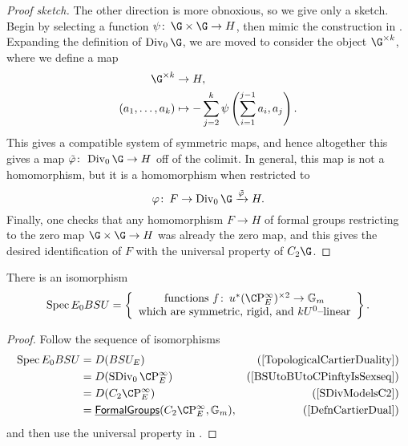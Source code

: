 \begin{proof}[Proof sketch]
The other direction is more obnoxious, so we give only a sketch.  Begin by selecting a function $\psi\co \G \times \G \to H$, then mimic the construction in .  Expanding the definition of $\Div_0 \G$, we are moved to consider the object $\G^{\times k}$, where we define a map
\begin{align*}
\G^{\times k} & \to H, \\
(a_1, \ldots, a_k) & \mapsto -\sum_{j=2}^k \psi\left(\sum_{i=1}^{j-1} a_i, a_j \right).
\end{align*}
This gives a compatible system of symmetric maps, and hence altogether this gives a map $\tilde\phi\co\Div_0 \G \to H$ off of the colimit.  In general, this map is not a homomorphism, but it is a homomorphism when restricted to \[\phi\co F \to \Div_0 \G \xrightarrow{\tilde\phi} H.\]  Finally, one checks that any homomorphism $F \to H$ of formal groups restricting to the zero map $\G \times \G \to H$ was already the zero map, and this gives the desired identification of $F$ with the universal property of $C_2 \G$.
\end{proof}

\begin{corollary}\label{CharacterizationOfBSUUpperE}
There is an isomorphism \[\Spec E_0 BSU = \left\{\begin{array}{c} \text{functions $f\co u^* (\CP^\infty_E)^{\times 2} \to \Gm$} \\ \text{which are symmetric, rigid, and $kU^0$--linear} \end{array}\right\}.\]
\end{corollary}
\begin{proof}
Follow the sequence of isomorphisms
\begin{align*}
\Spec E_0 BSU & = D(BSU_E) & \text{(\Cref{TopologicalCartierDuality})} \\
& = D(\SDiv_0 \CP^\infty_E) & \text{(\Cref{BSUtoBUtoCPinftyIsSexseq})} \\
& = D(C_2 \CP^\infty_E) & \text{(\Cref{SDivModelsC2})} \\
& = \InternalHom{FormalGroups}(C_2 \CP^\infty_E, \Gm), & \text{(\Cref{DefnCartierDual})}
\end{align*}
and then use the universal property in .
\end{proof}

